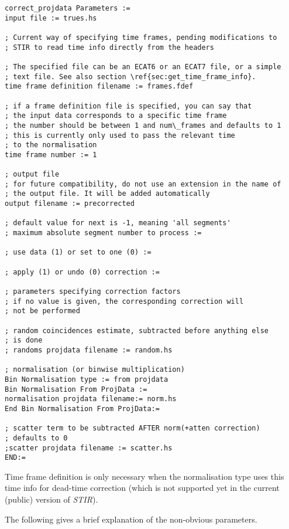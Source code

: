 \documentclass{article}
\begin{document}
\begin{verbatim}
correct_projdata Parameters := 
input file := trues.hs

; Current way of specifying time frames, pending modifications to
; STIR to read time info directly from the headers

; The specified file can be an ECAT6 or an ECAT7 file, or a simple
; text file. See also section \ref{sec:get_time_frame_info}. 
time frame definition filename := frames.fdef

; if a frame definition file is specified, you can say that 
; the input data corresponds to a specific time frame
; the number should be between 1 and num\_frames and defaults to 1
; this is currently only used to pass the relevant time 
; to the normalisation 
time frame number := 1

; output file
; for future compatibility, do not use an extension in the name of 
; the output file. It will be added automatically 
output filename := precorrected

; default value for next is -1, meaning 'all segments' 
; maximum absolute segment number to process :=  

; use data (1) or set to one (0) := 

; apply (1) or undo (0) correction := 

; parameters specifying correction factors 
; if no value is given, the corresponding correction will
; not be performed

; random coincidences estimate, subtracted before anything else 
; is done
; randoms projdata filename := random.hs 

; normalisation (or binwise multiplication) 
Bin Normalisation type := from projdata 
Bin Normalisation From ProjData := 
normalisation projdata filename:= norm.hs 
End Bin Normalisation From ProjData:=

; scatter term to be subtracted AFTER norm(+atten correction)
; defaults to 0 
;scatter projdata filename := scatter.hs
END:=
\end{verbatim}


Time frame definition is only necessary when the normalisation 
type uses this time info for dead-time correction (which is not 
supported yet in the current (public) version of \textit{STIR}).


The following gives a brief explanation of the non-obvious parameters. 
\end{document}
